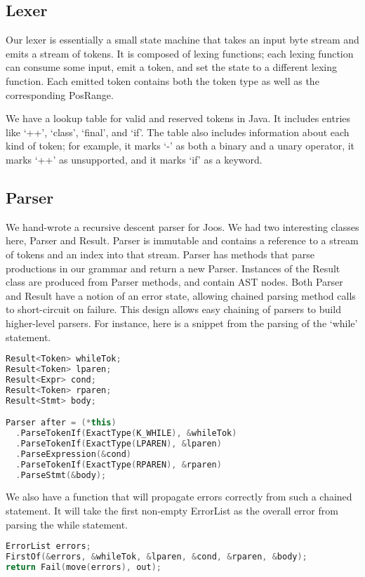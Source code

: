\documentclass[12pt, titlepage]{article}
\begin{document}
\subsection{Lexer}
Our lexer is essentially a small state machine that takes an input byte stream
and emits a stream of tokens. It is composed of lexing functions; each lexing
function can consume some input, emit a token, and set the state to a different
lexing function. Each emitted token contains both the token type as well as the
corresponding PosRange.

We have a lookup table for valid and reserved tokens in Java. It includes
entries like `++', `class', `final', and `if'. The table also includes
information about each kind of token; for example, it marks `-' as both a
binary and a unary operator, it marks `++' as unsupported, and it marks `if' as
a keyword.


\subsection{Parser}
We hand-wrote a recursive descent parser for Joos. We had two interesting
classes here, Parser and Result. Parser is immutable and contains a reference
to a stream of tokens and an index into that stream. Parser has methods that
parse productions in our grammar and return a new Parser. Instances of the
Result class are produced from Parser methods, and contain AST nodes. Both
Parser and Result have a notion of an error state, allowing chained parsing
method calls to short-circuit on failure. This design allows easy chaining of
parsers to build higher-level parsers. For instance, here is a snippet from the
parsing of the `while' statement.
\begin{lstlisting}[language=c++]
Result<Token> whileTok;
Result<Token> lparen;
Result<Expr> cond;
Result<Token> rparen;
Result<Stmt> body;

Parser after = (*this)
  .ParseTokenIf(ExactType(K_WHILE), &whileTok)
  .ParseTokenIf(ExactType(LPAREN), &lparen)
  .ParseExpression(&cond)
  .ParseTokenIf(ExactType(RPAREN), &rparen)
  .ParseStmt(&body);
\end{lstlisting}

We also have a function that will propagate errors correctly from such a
chained statement. It will take the first non-empty ErrorList as the overall
error from parsing the while statement.
\begin{lstlisting}[language=c++]
ErrorList errors;
FirstOf(&errors, &whileTok, &lparen, &cond, &rparen, &body);
return Fail(move(errors), out);
\end{lstlisting}
\end{document}
